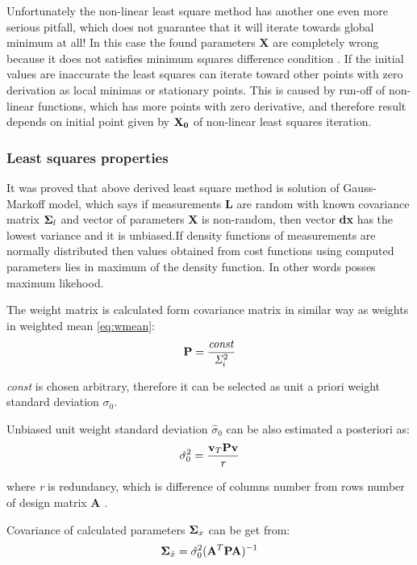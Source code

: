 \documentclass[a4paper,12pt]{article}
\newcommand{\ematr}[1]{
{\bf #1}
}
\newcommand{\evect}[1]{
{\bf #1}
}
\newcommand{\escal}[1]{
{\it #1}
}
\begin{document}
Unfortunately the non-linear least square method has another one even more serious pitfall, which 
does not guarantee that it will iterate towards global minimum at all!
In this case the found parameters \evect{X} are completely wrong because 
it does not satisfies minimum squares difference condition \label{eq:min_cond}. If the initial values are 
inaccurate the least squares can iterate toward other points with zero derivation as local minimas or stationary points.  
This is caused by run-off of non-linear functions, which has more points with zero derivative,
and therefore result depends on initial point given by $\evect{X_{0}}$  of non-linear least squares iteration.


\subsubsection{Least squares properties}

It was proved that above derived least square method is solution of Gauss-Markoff model, which 
says if measurements \evect{L} are random with known covariance matrix $\ematr{\Sigma}_{l}$  and vector of parameters \evect{X} is non-random, then
vector \evect{dx}  has the lowest variance and it is unbiased.If density functions of measurements are normally 
distributed then values obtained from cost functions using  computed parameters lies in maximum of the density
function. In other words posses maximum likehood.

The weight matrix is calculated form covariance matrix in similar way as weights in weighted mean \eqref{eq:wmean}:
\begin{equation}
\ematr{P} = \frac{\escal{const}}{\escal{\Sigma}_{i}^{2}}
\end{equation} 

\escal{const} is chosen arbitrary, therefore it can be selected as unit a priori weight standard deviation $\sigma_{0}$. 


Unbiased unit weight standard deviation $\hat{\sigma}_{0}$ can be also estimated a posteriori as:
\begin{equation}
\escal{\hat{\sigma}}_{0}^{2} = \frac{\evect{v}_{T} \ematr{P}  \evect{v}}{\escal{r}}
\end{equation} 

where \escal{r} is redundancy, which is difference of columns number from rows number of design matrix \ematr{A}.

Covariance of calculated parameters $\ematr{\Sigma}_{x}$ can be get from:
\begin{equation}
\ematr{\Sigma}_{\hat{x}} = \escal{\hat{\sigma}}_{0}^{2} (\ematr{A}^{T} \ematr{P} \ematr{A})^{-1}
\end{equation} 
\end{document}
